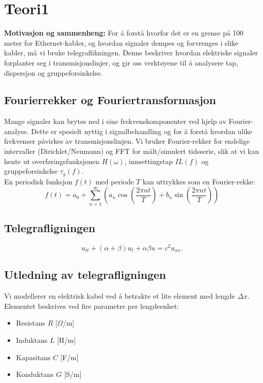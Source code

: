 
\section{Teori1}

    \textbf{Motivasjon og sammenheng:} For å forstå hvorfor det er en grense på 100 meter for Ethernet-kabler, og hvordan signaler dempes og forvrenges i slike kabler, må vi bruke telegraflikningen. Denne beskriver hvordan elektriske signaler forplanter seg i transmisjonslinjer, og gir oss verktøyene til å analysere tap, dispersjon og gruppeforsinkelse.

\subsection{Fourierrekker og Fouriertransformasjon}

Mange signaler kan brytes ned i sine frekvenskomponenter ved hjelp av Fourier-analyse. Dette er spesielt nyttig i signalbehandling og for å forstå hvordan ulike frekvenser påvirkes av transmisjonslinjen. Vi bruker Fourier-rekker for endelige intervaller (Dirichlet/Neumann) og FFT for målt/simulert tidsserie, slik at vi kan hente ut overføringsfunksjonen $H(\omega)$, innsettingstap $IL(f)$ og gruppeforsinkelse $\tau_g(f)$.\\[1em]
En periodisk funksjon $f(t)$ med periode $T$ kan uttrykkes som en Fourier-rekke:
\begin{equation}
f(t) = a_0 + \sum_{n=1}^{\infty} \left( a_n \cos\left(\frac{2\pi n t}{T}\right) + b_n \sin\left(\frac{2\pi n t}{T}\right) \right)
\end{equation}

\subsection{Telegrafligningen}
\begin{equation}
u_{tt} + (\alpha + \beta) u_t + \alpha \beta u = c^2 u_{xx}.
\end{equation}

\subsection{Utledning av telegrafligningen}

Vi modellerer en elektrisk kabel ved å betrakte et lite element med lengde $\Delta x$. Elementet beskrives ved fire parametre per lengdeenhet:  
\begin{itemize}
    \item Resistans $R$ [$\Omega$/m]  
    \item Induktans $L$ [H/m]  
    \item Kapasitans $C$ [F/m]  
    \item Konduktans $G$ [S/m]  
\end{itemize}


